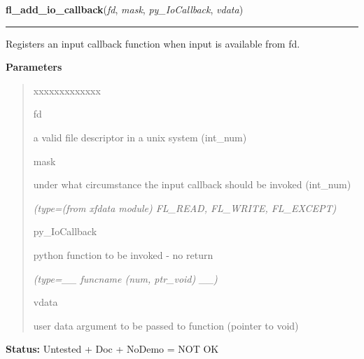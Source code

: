 \hspace{.8\funcindent}\begin{boxedminipage}{\funcwidth}

    \raggedright \textbf{fl\_add\_io\_callback}(\textit{fd}, \textit{mask}, \textit{py\_IoCallback}, \textit{vdata})

    \vspace{-1.5ex}

    \rule{\textwidth}{0.5\fboxrule}
\setlength{\parskip}{2ex}
    Registers an input callback function when input is available from fd.

\setlength{\parskip}{1ex}
      \textbf{Parameters}
      \vspace{-1ex}

      \begin{quote}
        \begin{Ventry}{xxxxxxxxxxxxx}

          \item[fd]

          a valid file descriptor in a unix system (int\_num)

          \item[mask]

          under what circumstance the input callback should be invoked 
          (int\_num)

            {\it (type=(from xfdata module) FL\_READ, FL\_WRITE, FL\_EXCEPT)}

          \item[py\_IoCallback]

          python function to be invoked - no return

            {\it (type=\_\_ funcname (num, ptr\_void) \_\_)}

          \item[vdata]

          user data argument to be passed to function (pointer to void)

        \end{Ventry}

      \end{quote}

\textbf{Status:} Untested + Doc + NoDemo = NOT OK



    \end{boxedminipage}

    \label{xformslib:library:fl_remove_io_callback}

